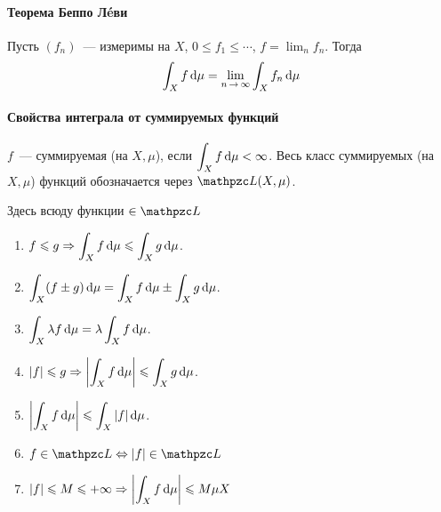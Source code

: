 \documentclass[12pt, timbord]{longnotes}
\begin{document}
\paragraph{Теорема Беппо \texorpdfstring{Л\'eви}{Леви}}
\label{par:meas::levi}

\begin{thrm}\label{thrm:meas::levi}
  Пусть $(f_n)$~--- измеримы на $X$, $0 \leqslant f_1 \leqslant \cdots $, 
  $f = \lim_n f_n$. Тогда 
  \[
    \int_X f \, \del \mu  = \lim_{n\to \infty} \int_X f_n \, \del \mu 
  \]
\end{thrm}

\paragraph{Свойства интеграла от суммируемых функций}
\label{par:meas::summprop}

\begin{defn}\label{defn:meas::summprop::summ}
  $f$~--- суммируемая (на $X,\mu$), если $\displaystyle \int _X f \, \mathrm{d} \mu < \infty$.
  Весь класс суммируемых (на $X,\mu$) функций обозначается через $\summb (X,\mu)$.
\end{defn}

Здесь всюду функции $\in \summb$
\begin{enumerate}
  \item $\displaystyle
    f \leqslant g \Rightarrow \int_X f \, \mathrm{d} \mu \leqslant \int_X g \, \mathrm{d} \mu$.
  
  \item $\displaystyle
    \int_X (f \pm g)\, \mathrm{d} \mu =  \int_X f \, \mathrm{d} \mu \pm \int_X g \, \mathrm{d} \mu$.

  \item $\displaystyle
    \int_X \lambda f \, \mathrm{d} \mu =  \lambda \int_X f \, \mathrm{d} \mu$.
  
  \item $\displaystyle
    |f| \leqslant g  \Rightarrow \left| \int_X f \, \mathrm{d}\mu \right|\leqslant \int_X g \, \mathrm{d} \mu$.

  \item $\displaystyle
    \left| \int_X f \, \mathrm{d} \mu \right| \leqslant \int_X |f| \, \mathrm{d} \mu$.
  
  \item $\displaystyle
    f \in \summb \Leftrightarrow |f| \in \summb$

  \item $\displaystyle
    |f| \leqslant M \leqslant +\infty 
    \Rightarrow \left| \int_X f \, \mathrm{d}\mu \right| \leqslant M \mu X$
\end{enumerate}
\end{document}
